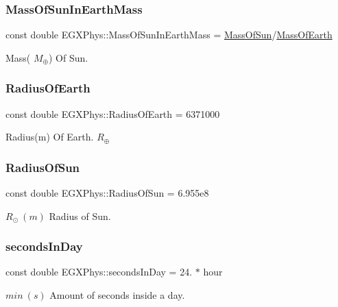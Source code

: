 \subsubsection{\texorpdfstring{Mass\+Of\+Sun\+In\+Earth\+Mass}{MassOfSunInEarthMass}}
{\footnotesize\ttfamily const double E\+G\+X\+Phys\+::\+Mass\+Of\+Sun\+In\+Earth\+Mass = \mbox{\hyperlink{namespace_e_g_x_phys_a6e84ae13f1dbcecb215af787bbc12cd6}{Mass\+Of\+Sun}}/\mbox{\hyperlink{namespace_e_g_x_phys_ace4a9d8c0b21215536857f4c1087a4e8}{Mass\+Of\+Earth}}}

Mass( $M_\oplus$) Of Sun. \mbox{\label{namespace_e_g_x_phys_a11a2d4a914eb43c4095e225358293a45}} 
\subsubsection{\texorpdfstring{Radius\+Of\+Earth}{RadiusOfEarth}}
{\footnotesize\ttfamily const double E\+G\+X\+Phys\+::\+Radius\+Of\+Earth = 6371000}

Radius(m) Of Earth. $R_\oplus$ \mbox{\label{namespace_e_g_x_phys_a983b842cceb4a584787874fc9486384d}} 
\subsubsection{\texorpdfstring{Radius\+Of\+Sun}{RadiusOfSun}}
{\footnotesize\ttfamily const double E\+G\+X\+Phys\+::\+Radius\+Of\+Sun = 6.\+955e8}

$R_\odot\ (m)$ Radius of Sun. \mbox{\label{namespace_e_g_x_phys_ab4f86327f64403b843077ecc189ce52b}} 
\subsubsection{\texorpdfstring{seconds\+In\+Day}{secondsInDay}}
{\footnotesize\ttfamily const double E\+G\+X\+Phys\+::seconds\+In\+Day = 24. $\ast$ hour}

$min\ (s)$ Amount of seconds inside a day. \mbox{\label{namespace_e_g_x_phys_a9a6a4eb13636aa068a3f1e41cde4d6fd}} 
